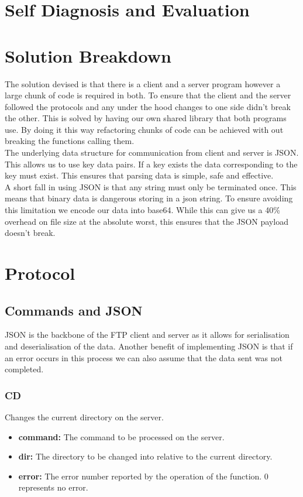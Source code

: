 \documentclass{article}
\begin{document}
\section{Self Diagnosis and Evaluation}


\section{Solution Breakdown}
The solution devised is that there is a client and a server program however a large chunk of code is required in both. To ensure that the client and the server followed the protocols and any under the hood changes to one side didn't break the other. This is solved by having our own shared library that both programs use. By doing it this way refactoring chunks of code can be achieved with out breaking the functions calling them.\\

The underlying data structure for communication from client and server is JSON. This allows us to use key data pairs. If a key exists the data corresponding to the key must exist. This ensures that parsing data is simple, safe and effective.\\

A short fall in using JSON is that any string must only be terminated once. This means that binary data is dangerous storing in a json string. To ensure avoiding this limitation we encode our data into base64. While this can give us a 40\% overhead on file size at the absolute worst, this ensures that the JSON payload doesn't break.

\section{Protocol}
\subsection{Commands and JSON}
JSON is the backbone of the FTP client and server as it allows for serialisation and deserialisation of the data. Another benefit of implementing JSON is that if an error occurs in this process we can also assume that the data sent was not completed.
\subsubsection{CD}
Changes the current directory on the server.
\begin{itemize}
\item \textbf{command:} The command to be processed on the server.
\item \textbf{dir:} The directory to be changed into relative to the current directory. 
\item \textbf{error:} The error number reported by the operation of the function. 0 represents no error.   
\end{itemize}
\end{document}
